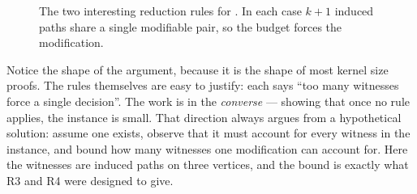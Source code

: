 \begin{figure}[ht]
\centering
{}
\caption{The two interesting reduction rules for . In each
case $k+1$ induced paths share a single modifiable pair, so the budget forces
the modification.}
\label{fig:cluster-rules}
\end{figure}

\begin{intuition}
Notice the shape of the argument, because it is the shape of most kernel size
proofs. The rules themselves are easy to justify: each says ``too many witnesses
force a single decision''. The work is in the \emph{converse} --- showing that
once no rule applies, the instance is small. That direction always argues from a
hypothetical solution: assume one exists, observe that it must account for
every witness in the instance, and bound how many witnesses one modification can
account for. Here the witnesses are induced paths on three vertices, and the
bound is exactly what R3 and R4 were designed to give.
\end{intuition}

